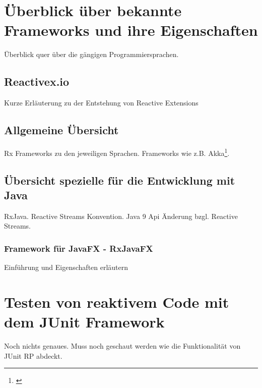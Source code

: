 \section{Überblick über bekannte Frameworks und ihre Eigenschaften}
Überblick quer über die gängigen Programmiersprachen. 
\subsection{Reactivex.io}
Kurze Erläuterung zu der Entstehung von Reactive Extensions
\subsection{Allgemeine Übersicht}
Rx Frameworks zu den jeweiligen Sprachen. Frameworks wie z.B. Akka\footnote{\cite{Karnok.2016}}. 
\subsection{Übersicht spezielle für die Entwicklung mit Java}
RxJava. Reactive Streams Konvention. Java 9 Api Änderung bzgl. Reactive Streams.
\subsubsection{Framework für JavaFX - RxJavaFX}
Einführung und Eigenschaften erläutern
\section{Testen von reaktivem Code mit dem JUnit Framework}
Noch nichts genaues. Muss noch geschaut werden wie die Funktionalität von JUnit RP abdeckt.